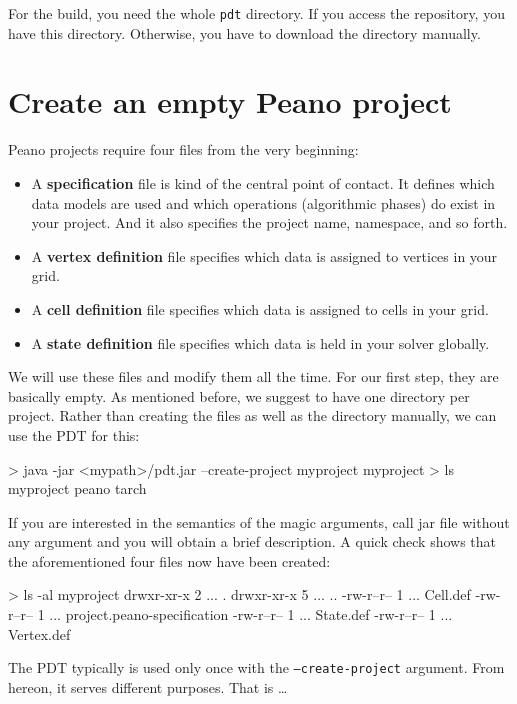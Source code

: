 \noindent
For the build, you need the whole \texttt{pdt} directory. If you access the
repository, you have this directory. Otherwise, you have to download the
directory manually.

\section{Create an empty Peano project}

Peano projects require four files from the very beginning:

\begin{itemize}
  \item A {\bf specification} file is kind of the central point of contact. It
  defines which data models are used and which operations (algorithmic phases)
  do exist in your project. And it also specifies the project name, namespace,
  and so forth.
  \item A {\bf vertex definition} file specifies which data is assigned to
  vertices in your grid.
  \item A {\bf cell definition} file specifies which data is assigned to
  cells in your grid.
  \item A {\bf state definition} file specifies which data is held in your
  solver globally.
\end{itemize}


\noindent
We will use these files and modify them all the time. For our first step, they
are basically empty.
As mentioned before, we suggest to have one directory per project.
Rather than creating the files as well as the directory manually, we can use the
PDT for this:

\begin{code}
> java -jar <mypath>/pdt.jar  --create-project myproject myproject 
> ls
  myproject  peano  tarch
\end{code}

\noindent
If you are interested in the semantics of the magic arguments, call jar file
without any argument and you will obtain a brief description.
A quick check shows that the aforementioned four files now have been created:


\begin{code}
> ls -al myproject
drwxr-xr-x 2 ...  .
drwxr-xr-x 5 ...  ..
-rw-r--r-- 1 ...  Cell.def
-rw-r--r-- 1 ...  project.peano-specification
-rw-r--r-- 1 ...  State.def
-rw-r--r-- 1 ...  Vertex.def
\end{code}

\noindent
The PDT typically is used only once with the \texttt{--create-project} argument.
From hereon, it serves different purposes. 
That is \ldots




